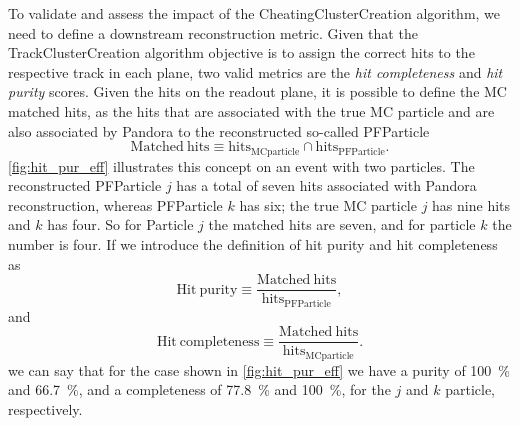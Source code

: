 To validate and assess the impact of the CheatingClusterCreation algorithm, we need to define a downstream reconstruction metric. Given that the TrackClusterCreation algorithm objective is to assign the correct hits to the respective track in each plane, two valid metrics are the \emph{hit completeness} and \emph{hit purity} scores. Given the hits on the readout plane, it is possible to define the MC matched hits, as the hits that are associated with the true MC particle and are also associated by Pandora to the reconstructed so-called PFParticle \begin{equation}
    \mathrm{Matched\ hits} \equiv \mathrm{hits_{MC particle} \cap hits_{PFParticle}}.
\end{equation} \autoref{fig:hit_pur_eff} illustrates this concept on an event with two particles. The reconstructed PFParticle $j$ has a total of seven hits associated with Pandora reconstruction, whereas PFParticle $k$ has six; the true MC particle $j$ has nine hits and $k$ has four. So for Particle $j$ the matched hits are seven, and for particle $k$ the number is four. If we introduce the definition of hit purity and hit completeness as \begin{equation}
    \mathrm{Hit\ purity} \equiv \frac{\mathrm{Matched\ hits}}{\mathrm{hits_{PFParticle}}}, 
\end{equation} and \begin{equation}
    \mathrm{Hit\ completeness} \equiv \frac{\mathrm{Matched\ hits}}{\mathrm{hits_{MC particle}}}. 
\end{equation} we can say that for the case shown in \autoref{fig:hit_pur_eff} we have a purity of \SI{100}{\percent} and \SI{66.7}{\percent}, and a completeness of \SI{77.8}{\percent} and \SI{100}{\percent}, for the $j$ and $k$ particle, respectively. 

